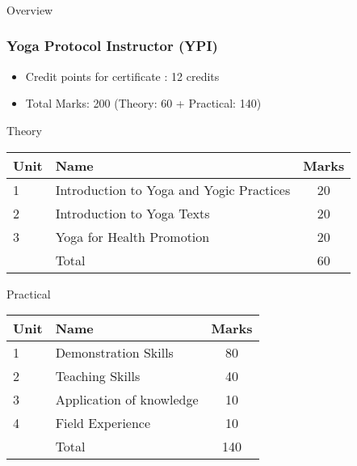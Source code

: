 \begin{frame}[fragile]\frametitle{}
\begin{center}
{\Large Overview}
\end{center}
\end{frame}

\begin{frame}[fragile] \frametitle{ Yoga Protocol Instructor (YPI) }
\begin{itemize}
\item Credit points for certificate : 12 credits 
\item Total Marks: 200 (Theory: 60 + Practical: 140) 
\end{itemize}

Theory

\begin{tabular}{|l|l|c|}
	\hline
	Unit & Name & Marks \\ \hline \hline
	1 & Introduction to Yoga and Yogic Practices  & 20 \\ \hline
	2 & Introduction to Yoga Texts   & 20 \\ \hline
	3 & Yoga for Health Promotion   & 20 \\ \hline \hline
	  & Total   & 60 \\ \hline
\end{tabular}

Practical

\begin{tabular}{|l|l|c|}
	\hline
	Unit & Name & Marks \\ \hline \hline
	1 & Demonstration Skills   & 80 \\ \hline
	2 & Teaching Skills    & 40 \\ \hline
	3 & Application of knowledge    & 10 \\ \hline 
	4 & Field Experience    & 10 \\ \hline \hline
	  & Total   & 140 \\ \hline
\end{tabular}
\end{frame}